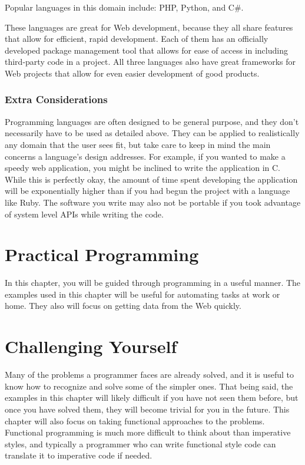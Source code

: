 \documentclass[12pt, oneside, a4paper]{book}
\begin{document}
         Popular languages in this domain include: PHP, Python, and C#.

         These languages are great for Web development, because they all share features that allow for efficient, rapid development.
         Each of them has an officially developed package management tool that allows for ease of access in including third-party code in a project.
         All three languages also have great frameworks for Web projects that allow for even easier development of good products.
         \subsection{Extra Considerations}
         Programming languages are often designed to be general purpose, and they don't necessarily have to be used as detailed above.
         They can be applied to realistically any domain that the user sees fit, but take care to keep in mind the main concerns a language's design addresses.
         For example, if you wanted to make a speedy web application, you might be inclined to write the application in C.
         While this is perfectly okay, the amount of time spent developing the application will be exponentially higher than if you had begun the project with a language like Ruby.
         The software you write may also not be portable if you took advantage of system level APIs while writing the code.
         
   \chapter{Practical Programming}
   \label{chap:practical}
      In this chapter, you will be guided through programming in a useful manner.
      The examples used in this chapter will be useful for automating tasks at work or home.
      They also will focus on getting data from the Web quickly.
   \chapter{Challenging Yourself}
   \label{chap:challenge}
      Many of the problems a programmer faces are already solved, and it is useful to know how to recognize and solve some of the simpler ones.
      That being said, the examples in this chapter will likely difficult if you have not seen them before, but once you have solved them, they will become trivial for you in the future.
      This chapter will also focus on taking functional approaches to the problems.
      Functional programming is much more difficult to think about than imperative styles, and typically a programmer who can write functional style code can translate it to imperative code if needed.
\end{document}
